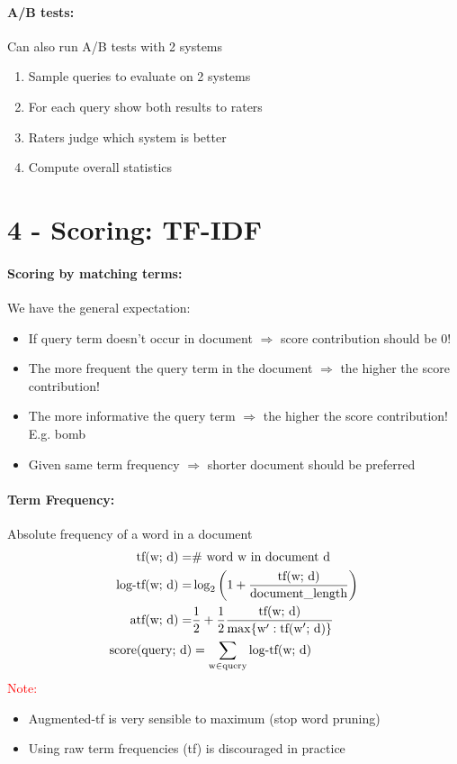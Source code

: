 \documentclass[a4paper,11pt]{article}
\newcommand{\msection}[1]{\section{#1}\vspace{-0.5mm}}
\newcommand{\tf}{\text{tf(w; d)}} %
\begin{document}
\begin{multicols}{2}
\paragraph{A/B tests:} Can also run A/B tests with 2 systems\\
\begin{enumerate}
  \item Sample queries to evaluate on 2 systems
  \item For each query show both results to raters
  \item Raters judge which system is better
  \item Compute overall statistics
\end{enumerate}

\msection{4 - Scoring: TF-IDF}
\paragraph{Scoring by matching terms:} We have the general expectation:
\begin{itemize}[leftmargin=0.3cm]
  \item If query term doesn't occur in document $\Rightarrow$ score contribution should be 0! 
  \item The more frequent the query term in the document $\Rightarrow$ the higher the score contribution!
  \item The more informative the query term $\Rightarrow$ the higher the score contribution! E.g. bomb
  \item Given same term frequency $\Rightarrow$ shorter document should be preferred
\end{itemize}

\paragraph{Term Frequency:} Absolute frequency of a word in a document
\begin{align*}
  \tf =& \# \text{ word w in document d}\\
  \text{log-tf(w; d)} =& \log_2\left(1 + \frac{\tf}{\text{document\_length}} \right)\\
  \text{atf(w; d)} =& \frac{1}{2} + \frac{1}{2} \frac{\tf}{\max\{ \text{w}' : \text{tf(w$'$; d)} \}} \\
  \text{score(\text{query}; d)} &= \sum_{\text w \in \text{query}} \text{log-tf(w; d)} 
\end{align*}
\textcolor{red}{Note:}
\begin{itemize}[leftmargin=0.3cm]
  \item Augmented-tf is very sensible to maximum (stop word pruning)
  \item Using raw term frequencies (tf) is discouraged in practice
\end{itemize}


\end{multicols}
\end{document}
